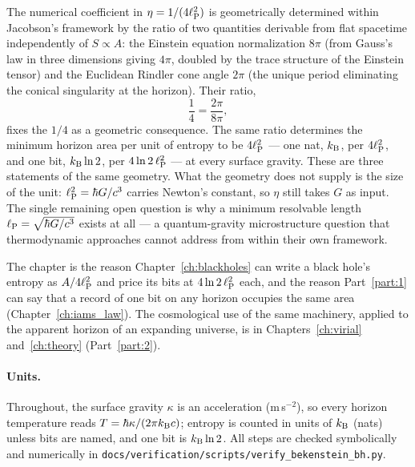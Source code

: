 The numerical coefficient in $\eta=1/(4\ell_{\mathrm P}^2)$ is geometrically determined within Jacobson's framework by the ratio of two quantities derivable from
flat spacetime independently of $S\propto A$: the Einstein equation normalization $8\pi$ (from Gauss's law in three dimensions giving $4\pi$, doubled
by the trace structure of the Einstein tensor) and the Euclidean Rindler cone angle $2\pi$ (the unique period eliminating the conical singularity at
the horizon). Their ratio,
\begin{equation}
\frac14=\frac{2\pi}{8\pi},
\end{equation}
fixes the $1/4$ as a geometric consequence. The same ratio determines the minimum horizon area per unit of entropy to be $4\ell_{\mathrm P}^2$ --- one nat,
$k_{\mathrm B}$, per $4\ell_{\mathrm P}^2$, and one bit, $k_{\mathrm B}\ln2$, per $4\ln2\,\ell_{\mathrm P}^2$ --- at every surface gravity. These are three statements of the same geometry. What
the geometry does not supply is the size of the unit: $\ell_{\mathrm P}^2=\hbar G/c^3$ carries Newton's constant, so $\eta$ still takes $G$ as input. The single
remaining open question is why a minimum resolvable length $\ell_{\mathrm P}=\sqrt{\hbar G/c^3}$ exists at all --- a quantum-gravity microstructure question that
thermodynamic approaches cannot address from within their own framework.

The chapter is the reason Chapter~\ref{ch:blackholes} can write a black hole's entropy as $A/4\ell_{\mathrm P}^2$ and price its bits at $4\ln2\,\ell_{\mathrm P}^2$ each, and the
reason Part~\ref{part:1} can say that a record of one bit on any horizon occupies the same area (Chapter~\ref{ch:iams_law}). The cosmological use of the
same machinery, applied to the apparent horizon of an expanding universe, is in Chapters~\ref{ch:virial} and~\ref{ch:theory} (Part~\ref{part:2}).

\paragraph{Units.} Throughout, the surface gravity $\kappa$ is an acceleration (m\,s$^{-2}$), so every horizon temperature reads $T=\hbar\kappa/(2\pi k_{\mathrm B} c)$;
entropy is counted in units of $k_{\mathrm B}$ (nats) unless bits are named, and one bit is $k_{\mathrm B}\ln2$. All steps are checked symbolically and numerically in
\texttt{docs/verification/scripts/verify\_bekenstein\_bh.py}.

